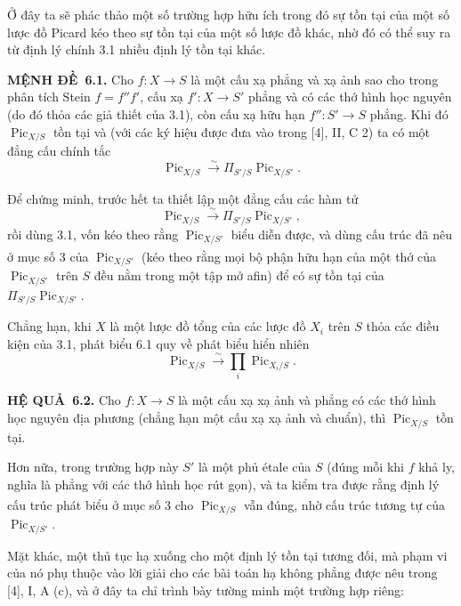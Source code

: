 \documentclass[11pt,twoside,openany]{book}
\numberwithin{equation}{section}
\newcommand{\src}[1]{%
  \phantomsection\hypertarget{src:\fgasourceid:#1}{}%
  \marginpar{\raggedleft\footnotesize\sffamily #1}%
}
\newcommand{\fgasourceid}{unset}
\newcommand{\result}[2]{\par\medskip\noindent\textbf{#1\if\relax\detokenize{#2}\relax\else\ #2\fi.}\quad}
\begin{document}
Ở đây ta sẽ phác thảo một số trường hợp hữu ích trong đó sự tồn tại của một số
lược đồ Picard kéo theo sự tồn tại của một số lược đồ khác, nhờ đó có thể suy
ra từ định lý chính 3.1 nhiều định lý tồn tại khác.

\result{MỆNH ĐỀ}{6.1} Cho $f:X\longrightarrow S$ là một cấu xạ phẳng và xạ ảnh
sao cho trong phân tích Stein $f=f''f'$, cấu xạ
$f':X\longrightarrow S'$ phẳng và có các thớ hình học nguyên (do đó thỏa các
giả thiết của 3.1), còn cấu xạ hữu hạn $f'':S'\longrightarrow S$ phẳng. Khi đó
$\operatorname{Pic}_{X/S}$ tồn tại và (với các ký hiệu được đưa vào trong [4],
II, C 2) ta có một đẳng cấu chính tắc
\[
\operatorname{Pic}_{X/S}\xrightarrow{\sim}
\Pi_{S'/S}\operatorname{Pic}_{X/S'}.
\]

Để chứng minh, trước hết ta thiết lập một đẳng cấu các hàm tử
\[
\operatorname{Pic}_{X/S}\xrightarrow{\sim}
\Pi_{S'/S}\operatorname{Pic}_{X/S'},
\]
rồi dùng 3.1, vốn kéo theo rằng $\operatorname{Pic}_{X/S'}$ biểu diễn được, và
dùng cấu trúc đã nêu ở mục số\textsuperscript{} 3 của
$\operatorname{Pic}_{X/S'}$ (kéo theo rằng mọi bộ phận hữu hạn của một thớ của
$\operatorname{Pic}_{X/S'}$ trên $S$ đều nằm trong một tập mở afin) để có sự
tồn tại của $\Pi_{S'/S}\operatorname{Pic}_{X/S'}$.
\src{158}
Chẳng hạn, khi $X$ là một lược đồ tổng của các lược đồ $X_i$ trên $S$ thỏa các
điều kiện của 3.1, phát biểu 6.1 quy về phát biểu hiển nhiên
\[
\operatorname{Pic}_{X/S}\xrightarrow{\sim}
\prod_i\operatorname{Pic}_{X_i/S}.
\]

\result{HỆ QUẢ}{6.2} Cho $f:X\longrightarrow S$ là một cấu xạ xạ ảnh và phẳng
có các thớ hình học nguyên địa phương (chẳng hạn một cấu xạ xạ ảnh và chuẩn),
thì $\operatorname{Pic}_{X/S}$ tồn tại.

Hơn nữa, trong trường hợp này $S'$ là một phủ étale của $S$ (đúng mỗi khi $f$
khả ly, nghĩa là phẳng với các thớ hình học rút gọn), và ta kiểm tra được rằng
định lý cấu trúc phát biểu ở mục số\textsuperscript{} 3 cho
$\operatorname{Pic}_{X/S}$ vẫn đúng, nhờ cấu trúc tương tự của
$\operatorname{Pic}_{X/S'}$.

Mặt khác, một thủ tục hạ xuống cho một định lý tồn tại tương đối, mà phạm vi
của nó phụ thuộc vào lời giải cho các bài toán hạ không phẳng được nêu trong
[4], I, A (c), và ở đây ta chỉ trình bày tường minh một trường hợp riêng:
\end{document}
